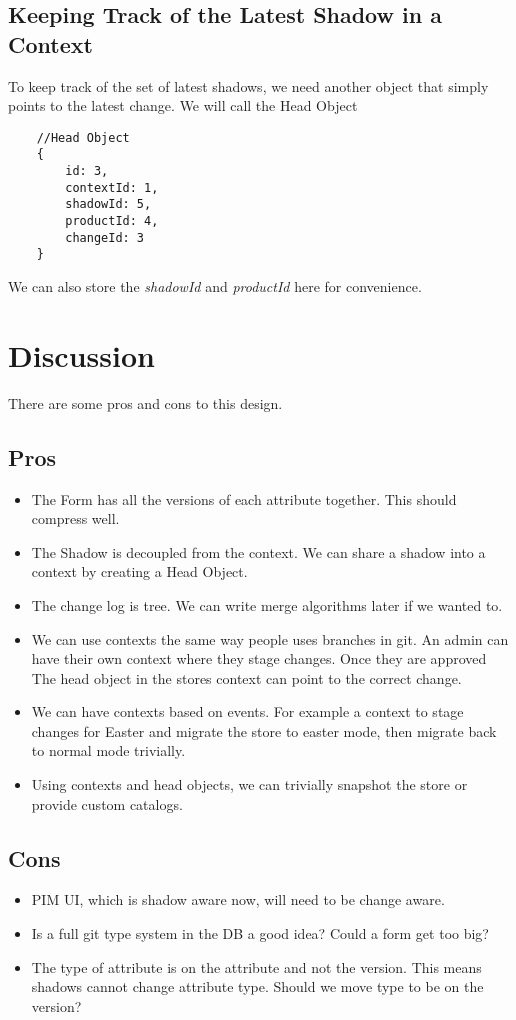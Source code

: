 \documentclass[11pt]{article}
\begin{document}
\subsection{Keeping Track of the Latest Shadow in a Context}

To keep track of the set of latest shadows, we need another object that simply
points to the latest change. We will call the Head Object

\begin{lstlisting}
    //Head Object
    {
        id: 3,
        contextId: 1,
        shadowId: 5,
        productId: 4,
        changeId: 3
    }
\end{lstlisting}

We can also store the \emph{shadowId} and \emph{productId} here for convenience.

\section{Discussion}

There are some pros and cons to this design. 

\subsection{Pros}

\begin{itemize}
    \item The Form has all the versions of each attribute together. This should
        compress well.
    \item The Shadow is decoupled from the context. We can share a shadow into
        a context by creating a Head Object.
    \item The change log is tree. We can write merge algorithms later if we wanted
        to.
    \item We can use contexts the same way people uses branches in git. An admin
        can have their own context where they stage changes. Once they are approved
        The head object in the stores context can point to the correct change.
    \item We can have contexts based on events. For example a context to stage
        changes for Easter and migrate the store to easter mode, then migrate
        back to normal mode trivially.
    \item Using contexts and head objects, we can trivially snapshot the store
        or provide custom catalogs. 
\end{itemize}

\subsection{Cons}
\begin{itemize}
    \item PIM UI, which is shadow aware now, will need to be change aware.
    \item Is a full git type system in the DB a good idea? Could a form get too big?
    \item The type of attribute is on the attribute and not the version. This means
        shadows cannot change attribute type. Should we move type to be on the version?
\end{itemize}
\end{document}
